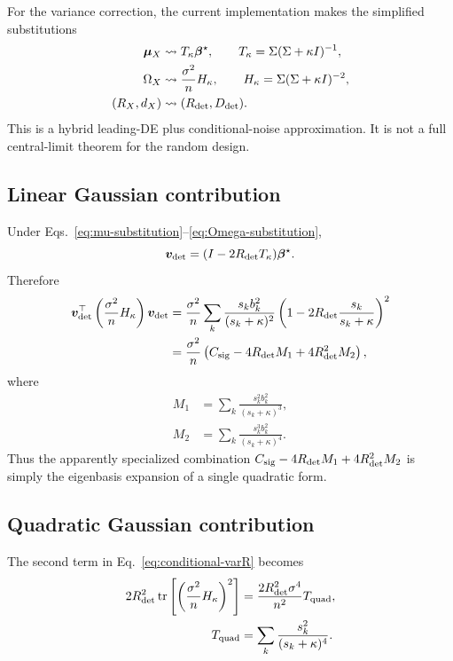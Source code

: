 \documentclass[11pt]{article}
\newcommand{\tr}{\operatorname{tr}}
\newcommand{\bstar}{\bm\beta^\star}
\begin{document}
For the variance correction, the current implementation makes the simplified
substitutions
\begin{align}
  \bm\mu_X&\rightsquigarrow
  T_\kappa\bstar,\qquad
  T_\kappa=\Sigma(\Sigma+\kappa I)^{-1},
  \label{eq:mu-substitution}\\
  \Omega_X&\rightsquigarrow
  \frac{\sigma^2}{n}H_\kappa,\qquad
  H_\kappa=\Sigma(\Sigma+\kappa I)^{-2},
  \label{eq:Omega-substitution}\\
  (R_X,d_X)&\rightsquigarrow(R_{\rm det},D_{\rm det}).
\end{align}
This is a hybrid leading-DE plus conditional-noise approximation.  It is not a
full central-limit theorem for the random design.

\subsection{Linear Gaussian contribution}

Under Eqs.~\eqref{eq:mu-substitution}--\eqref{eq:Omega-substitution},
\begin{equation}
  \bm v_{\rm det}
  =(I-2R_{\rm det}T_\kappa)\bstar.
\end{equation}
Therefore
\begin{align}
  \bm v_{\rm det}^\top
  \left(\frac{\sigma^2}{n}H_\kappa\right)
  \bm v_{\rm det}
  &=
  \frac{\sigma^2}{n}
  \sum_k
  \frac{s_kb_k^2}{(s_k+\kappa)^2}
  \left(1-2R_{\rm det}\frac{s_k}{s_k+\kappa}\right)^2\\
  &=
  \frac{\sigma^2}{n}
  \left(
    C_{\rm sig}
    -4R_{\rm det}M_1
    +4R_{\rm det}^2M_2
  \right),
  \label{eq:var-linear}
\end{align}
where
\begin{align}
  M_1&=\sum_k\frac{s_k^2b_k^2}{(s_k+\kappa)^3},\\
  M_2&=\sum_k\frac{s_k^3b_k^2}{(s_k+\kappa)^4}.
\end{align}
Thus the apparently specialized combination
\(C_{\rm sig}-4R_{\rm det}M_1+4R_{\rm det}^2M_2\) is simply the eigenbasis
expansion of a single quadratic form.

\subsection{Quadratic Gaussian contribution}

The second term in Eq.~\eqref{eq:conditional-varR} becomes
\begin{align}
  2R_{\rm det}^2
  \tr\left[
    \left(\frac{\sigma^2}{n}H_\kappa\right)^2
  \right]
  &=
  \frac{2R_{\rm det}^2\sigma^4}{n^2}
  T_{\rm quad},\\
  T_{\rm quad}
  &=\sum_k\frac{s_k^2}{(s_k+\kappa)^4}.
  \label{eq:var-quadratic}
\end{align}
\end{document}
